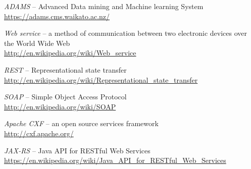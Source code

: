 %

\begin{thebibliography}{999}

		\textit{ADAMS} -- Advanced Data mining and Machine learning System \\
		{\scriptsize \url{https://adams.cms.waikato.ac.nz/}{}}
		
		\textit{Web service} -- a method of communication between two electronic 
		devices over the World Wide Web \\
		{\scriptsize \url{http://en.wikipedia.org/wiki/Web_service}{}}
		
		\textit{REST} -- Representational state transfer \\
		{\scriptsize \url{http://en.wikipedia.org/wiki/Representational_state_transfer}{}}

		\textit{SOAP} -- Simple Object Access Protocol \\
		\url{http://en.wikipedia.org/wiki/SOAP}{}

		\textit{Apache CXF} -- an open source services framework \\
		{\scriptsize \url{http://cxf.apache.org/}{}}
		
		\textit{JAX-RS} -- Java API for RESTful Web Services \\
		{\scriptsize \url{https://en.wikipedia.org/wiki/Java_API_for_RESTful_Web_Services}{}}

\end{thebibliography}
